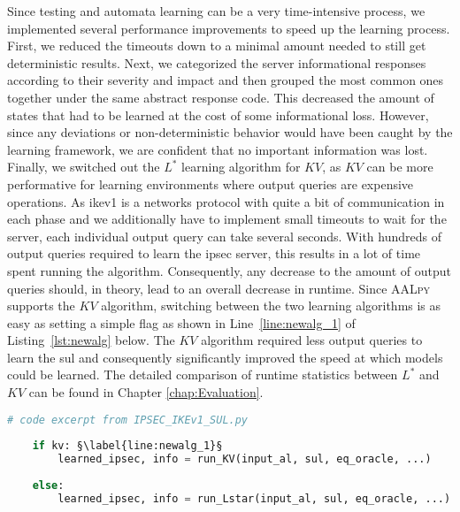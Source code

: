Since testing and automata learning can be a very time-intensive process, we implemented several performance improvements to speed up the learning process. First, we reduced the timeouts down to a minimal amount needed to still get deterministic results. Next, we categorized the server informational responses according to their severity and impact and then grouped the most common ones together under the same abstract response code. This decreased the amount of states that had to be learned at the cost of some informational loss. However, since any deviations or non-deterministic behavior would have been caught by the learning framework, we are confident that no important information was lost. Finally, we switched out the $L^*$ learning algorithm for $KV$, as $KV$ can be more performative for learning environments where output queries are expensive operations. As \ac{ike}v1 is a networks protocol with quite a bit of communication in each phase and we additionally have to implement small timeouts to wait for the server, each individual output query can take several seconds. With hundreds of output queries required to learn the \ac{ipsec} server, this results in a lot of time spent running the algorithm. Consequently, any decrease to the amount of output queries should, in theory, lead to an overall decrease in runtime. Since \textsc{AALpy} supports the $KV$ algorithm, switching between the two learning algorithms is as easy as setting a simple flag as shown in Line~\ref{line:newalg_1} of Listing~\ref{lst:newalg} below. The $KV$ algorithm required less output queries to learn the \ac{sul} and consequently significantly improved the speed at which models could be learned. The detailed comparison of runtime statistics between $L^*$ and $KV$ can be found in Chapter \ref{chap:Evaluation}. \\

\begin{lstlisting}[float=ht, caption=Switching learning algorithms in code., label=lst:newalg, language=python, escapechar=§]
	# code excerpt from IPSEC_IKEv1_SUL.py
	
	if kv: §\label{line:newalg_1}§
		learned_ipsec, info = run_KV(input_al, sul, eq_oracle, ...)
	
	else:
		learned_ipsec, info = run_Lstar(input_al, sul, eq_oracle, ...)
\end{lstlisting}


